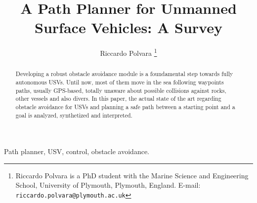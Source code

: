 \documentclass[journal]{IEEEtran}
\begin{document}
%
\title{A Path Planner for Unmanned Surface Vehicles: A Survey}
%
%
%

\author{Riccardo Polvara%
\thanks{Riccardo Polvara is a PhD student with the Marine Science and Engineering School, University of Plymouth, Plymouth, England.
      E-mail: {\tt riccardo.polvara@plymouth.ac.uk}}}




\maketitle


\begin{abstract}
Developing a robust obstacle avoidance module is a foundamental step towards fully autonomous USVs. Until now, most of them move in the sea following way\-points paths,
 usually GPS-based, totally unaware about possible collisions against rocks, other vessels and also divers. In this paper, the actual state of the art regarding obstacle avoidance for USVs and planning a safe path between a starting point and a goal is analyzed, synthetized and interpreted.
\end{abstract}


\begin{IEEEkeywords}
Path planner, USV, control, obstacle avoidance.
\end{IEEEkeywords}



%
\end{document}
